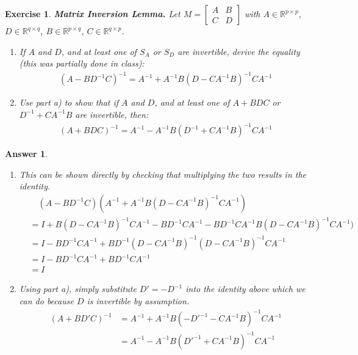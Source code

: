 \documentclass[12pt]{article}
\theoremstyle{colon}
\newtheorem{exercise}{Exercise}
\newtheorem*{answer}{Answer}
\begin{document}
\begin{exercise}
  \textbf{Matrix Inversion Lemma.} Let $M = \begin{bmatrix} A & B \\ C & D \end{bmatrix}$ with $A \in \mathbb{R}^{p \times p}$, $D \in \mathbb{R}^{q \times q}$, $B \in \mathbb{R}^{p \times q}$, $C \in \mathbb{R}^{q \times p}$.

  \begin{enumerate}[label=\alph*)]
    \item If $A$ and $D$, and at least one of $S_A$ or $S_D$ are invertible, derive the equality (this was partially done in class):
      \begin{gather*}
        (A - B D^{-1} C)^{-1} = A^{-1} + A^{-1} B (D - C A^{-1} B)^{-1} C A^{-1}
      \end{gather*}

    \item Use part a) to show that if $A$ and $D$, and at least one of $A + B D C$ or $D^{-1} + C A^{-1} B$ are invertible, then:
      \begin{gather*}
        (A + B D C)^{-1} = A^{-1} - A^{-1} B (D^{-1} + C A^{-1} B)^{-1} C A^{-1}
      \end{gather*}
  \end{enumerate}
\end{exercise}

\begin{answer}
  \

  \begin{enumerate}[label=\alph*)]
    \item This can be shown directly by checking that multiplying the two results in the identity.
      \begin{align*}
        &\quad (A - BD^{-1}C)(A^{-1} + A^{-1} B (D - C A^{-1} B)^{-1} C A^{-1}) \\
        &= I + B(D - C A^{-1} B)^{-1} C A^{-1} - BD^{-1}CA^{-1} - BD^{-1}CA^{-1} B (D - C A^{-1} B)^{-1} C A^{-1}) \\
        &= I - BD^{-1}CA^{-1} + BD^{-1}(D - C A^{-1} B)^{-1} (D - C A^{-1} B)^{-1} C A^{-1} \\
        &= I - BD^{-1}CA^{-1} + BD^{-1}CA^{-1} \\
        &= I
      \end{align*}

    \item Using part a), simply substitute $D' = -D^{-1}$ into the identity above which we can do because $D$ is invertible by assumption.
      \begin{align*}
        (A + B D' C)^{-1} &= A^{-1} + A^{-1} B (-D'^{-1} - C A^{-1} B)^{-1} C A^{-1} \\
        &= A^{-1} - A^{-1} B (D'^{-1} + C A^{-1} B)^{-1} C A^{-1}
      \end{align*}
  \end{enumerate}
\end{answer}
\end{document}
